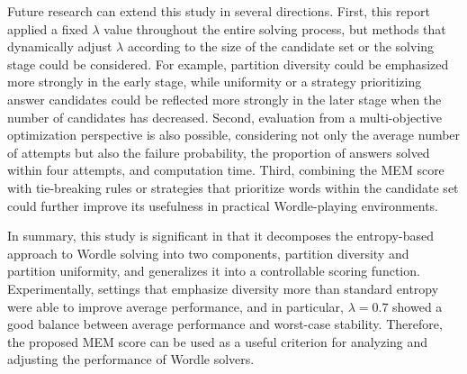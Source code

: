 \documentclass[11pt]{article}
\begin{document}
Future research can extend this study in several directions.
First, this report applied a fixed $\lambda$ value throughout the entire solving process, but methods that dynamically adjust $\lambda$ according to the size of the candidate set or the solving stage could be considered.
For example, partition diversity could be emphasized more strongly in the early stage, while uniformity or a strategy prioritizing answer candidates could be reflected more strongly in the later stage when the number of candidates has decreased.
Second, evaluation from a multi-objective optimization perspective is also possible, considering not only the average number of attempts but also the failure probability, the proportion of answers solved within four attempts, and computation time.
Third, combining the MEM score with tie-breaking rules or strategies that prioritize words within the candidate set could further improve its usefulness in practical Wordle-playing environments.

In summary, this study is significant in that it decomposes the entropy-based approach to Wordle solving into two components, partition diversity and partition uniformity, and generalizes it into a controllable scoring function.
Experimentally, settings that emphasize diversity more than standard entropy were able to improve average performance, and in particular, $\lambda = 0.7$ showed a good balance between average performance and worst-case stability.
Therefore, the proposed MEM score can be used as a useful criterion for analyzing and adjusting the performance of Wordle solvers.
\end{document}

